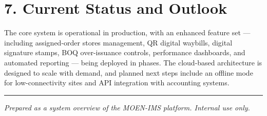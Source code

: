 \documentclass[11pt,a4paper]{article}
\begin{document}
\section{7. Current Status and Outlook}
The core system is operational in production, with an enhanced feature set —
including assigned-order stores management, QR digital waybills, digital signature
stamps, BOQ over-issuance controls, performance dashboards, and automated reporting —
being deployed in phases. The cloud-based architecture is designed to scale with
demand, and planned next steps include an offline mode for low-connectivity sites
and API integration with accounting systems.

\vspace{6pt}
\hrule
\vspace{4pt}
{\footnotesize\itshape Prepared as a system overview of the MOEN-IMS platform. Internal use only.}
\end{document}
